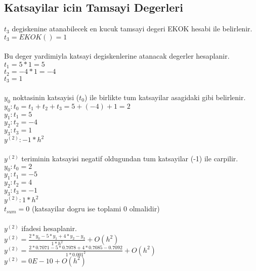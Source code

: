 \documentclass{article}
\begin{document}
\subsection{Katsayilar icin Tamsayi Degerleri}
$t_{3}$ degiskenine atanabilecek en kucuk tamsayi degeri EKOK hesabi ile belirlenir.\\
$t_{3}=EKOK()=1$\\
\\
Bu deger yardimiyla katsayi degiskenlerine atanacak degerler hesaplanir.\\
$\displaystyle t_{1}=5*1=5$\\
$\displaystyle t_{2}=-4*1=-4$\\
$\displaystyle t_{3}=1$\\
\\
$y_{0}$ noktasinin katsayisi ($t_{0}$) ile birlikte tum katsayilar asagidaki gibi belirlenir.\\
$y_{0}: t_{0}=t_{1}+t_{2}+t_{3}=5+(-4)+1=2$\\
$y_{1}: t_{1}=5$\\
$y_{2}: t_{2}=-4$\\
$y_{3}: t_{3}=1$\\
$y^{(2)}: -1*h^2$\\
\\
$y^{(2)}$ teriminin katsayisi negatif oldugundan tum katsayilar (-1) ile carpilir.\\
$y_{0}: t_{0}=2$\\
$y_{1}: t_{1}=-5$\\
$y_{2}: t_{2}=4$\\
$y_{3}: t_{3}=-1$\\
$y^{(2)}: 1*h^{2}$\\
$t_{sum} = 0$ (katsayilar dogru ise toplami 0 olmalidir)\\
\\
$y^{(2)}$ ifadesi hesaplanir.\\
$y^{(2)}=\frac{2*y_{0}-5*y_{1}+4*y_{2}-y_{3}}{1*h^{2}}+O(h^{2})$\\
$y^{(2)}=\frac{2*0.7071-5*0.7078+4*0.7085-0.7092}{1*0.001^{2}}+O(h^{2})$\\
$y^{(2)}=0E-10+O(h^{2})$\\
\end{document}
